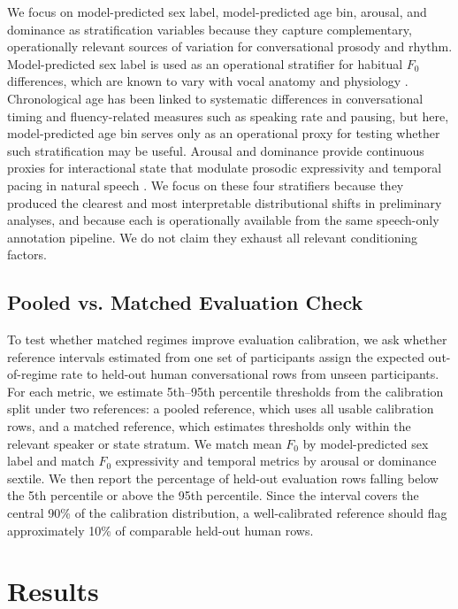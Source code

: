 \documentclass[conference]{IEEEtran}
\begin{document}
We focus on model-predicted sex label, model-predicted age bin, arousal, and dominance as stratification variables because they capture complementary, operationally relevant sources of variation for conversational prosody and rhythm. 
Model-predicted sex label is used as an operational stratifier for habitual $F_0$ differences, which are known to vary with vocal anatomy and physiology \cite{traunmuller_acoustic_2000, titze_toward_1994}. 
Chronological age has been linked to systematic differences in conversational timing and fluency-related measures such as speaking rate and pausing\cite{tauroza_speech_1990, goldman1958speech, goldman1961significance}, but here, model-predicted age bin serves only as an operational proxy for testing whether such stratification may be useful. 
Arousal and dominance provide continuous proxies for interactional state that modulate prosodic expressivity and temporal pacing in natural speech \cite{banziger_role_2005, pell_emotional_2011, banse1996acoustic}. 
We focus on these four stratifiers because they produced the clearest and most interpretable distributional shifts in preliminary analyses, and because each is operationally available from the same speech-only annotation pipeline. We do not claim they exhaust all relevant conditioning factors.

\subsection{Pooled vs. Matched Evaluation Check}
To test whether matched regimes improve evaluation calibration, we ask whether reference intervals estimated from one set of participants assign the expected out-of-regime rate to held-out human conversational rows from unseen participants. 
For each metric, we estimate 5th--95th percentile thresholds from the calibration split under two references: a pooled reference, which uses all usable calibration rows, and a matched reference, which estimates thresholds only within the relevant speaker or state stratum. 
We match mean $F_0$ by model-predicted sex label and match $F_0$ expressivity and temporal metrics by arousal or dominance sextile. 
We then report the percentage of held-out evaluation rows falling below the 5th percentile or above the 95th percentile. Since the interval covers the central 90\% of the calibration distribution, a well-calibrated reference should flag approximately 10\% of comparable held-out human rows.

\section{Results}\label{sec:regimes}
\end{document}
